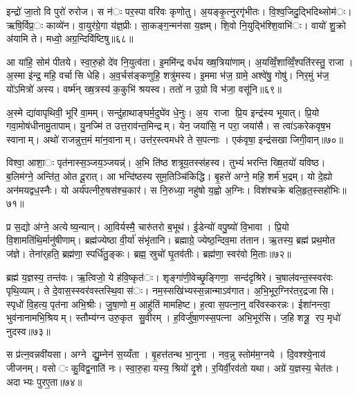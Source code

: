 इन्द्रो॑ जा॒तो वि पुरो॑ रुरोज। स न॑ः पर॒स्पा वरि॑वः कृणोतु। अ॒यङ्कृ॒त्नुरगृ॑भीतः। वि॒श्व॒जिदु॒द्भिदिथ्सोम॑ः। ऋषि॒र्विप्र॒ः काव्ये॑न। वा॒युर॑ग्रे॒गा य॑ज्ञ॒प्रीः। सा॒कङ्ग॒न्मन॑सा य॒ज्ञम्। शि॒वो नि॒युद्भि॑श्शि॒वाभि॑ः। वायो॑ शु॒क्रो अ॑यामि ते। मध्वो॒ अग्र॒न्दिवि॑ष्टिषु॥६८॥

आ या॑हि॒ सोम॑ पीतये। स्वा॒रु॒हो दे॑व नि॒युत्व॑ता। इ॒ममि॑न्द्र वर्धय ख्ष॒त्रिया॑णाम्। अ॒यव्विँ॒शाव्विँ॒श्पति॑रस्तु॒ राजा। अ॒स्मा इ॑न्द्र॒ महि॒ वर्चासि धेहि। अ॒व॒र्चस॑ङ्कणुहि॒ शत्रु॑मस्य। इ॒ममा भ॑ज॒ ग्रामे॒ अश्वे॑षु॒ गोषु॑। निर॒मुं भ॑ज॒ यो॑ऽमित्रो॑ अस्य। वर्ष्म॑न् ख्ष॒त्रस्य॑ क॒कुभि॑ श्रयस्व। ततो॑ न उ॒ग्रो वि भ॑जा॒ वसू॑नि॥६९॥

अ॒स्मे द्या॑वापृथिवी॒ भूरि॑ वा॒मम्। सन्दु॑हाथाङ्घर्म॒दुघे॑व धे॒नुः। अ॒य राजा प्रि॒य इन्द्र॑स्य भूयात्। प्रि॒यो गवा॒मोष॑धीनामु॒तापाम्। यु॒नज्मि॑ त उत्त॒राव॑न्त॒मिन्द्रम्। येन॒ जया॑सि॒ न परा॒ जया॑सै। स त्वा॑ऽकरेकवृष॒भ स्वानाम्। अथो॑ राजन्नुत्त॒मं मा॑न॒वानाम्। उत्त॑र॒स्त्वमध॑रे ते स॒पत्नाः। एक॑वृषा॒ इन्द्र॑सखा जिगी॒वान्॥७०॥

विश्वा॒ आशा॒ः पृत॑नास्स॒ञ्जय॒ञ्जयन्न्॑। अ॒भि ति॑ष्ठ शत्रूय॒तस्स॑हस्व। तुभ्यं॑ भरन्ति ख्षि॒तयो॑ यविष्ठ। ब॒लिम॑ग्ने॒ अन्ति॑त॒ ओत दू॒रात्। आ भन्दि॑ष्ठस्य सुम॒तिञ्चि॑किद्धि। बृ॒हत्ते॑ अग्ने॒ महि॒ शर्म॑ भ॒द्रम्। यो दे॒ह्यो अन॑मयद्वध॒स्नैः। यो अर्य॑पत्नीरु॒षस॑श्च॒कार॑। स नि॒रुध्या॒ नहु॑षो य॒ह्वो अ॒ग्निः। विश॑श्चक्रे बलि॒हृत॒स्सहो॑भिः॥७१॥

प्र स॒द्यो अ॑ग्ने॒ अत्येष्य॒न्यान्। आ॒विर्यस्मै॒ चारु॑तरो ब॒भूथ॑। ई॒डेन्यो॑ वपु॒ष्यो॑ वि॒भावा। प्रि॒यो वि॒शामति॑थि॒र्मानु॑षीणाम्। ब्रह्म॑ज्येष्ठा वी॒र्या॑ संभृ॑तानि। ब्रह्माग्रे॒ ज्येष्ठ॒न्दिव॒मा त॑तान। ऋ॒तस्य॒ ब्रह्म॑ प्रथ॒मोत ज॑ज्ञे। तेना॑र्‌हति॒ ब्रह्म॑णा॒ स्पर्धि॑तु॒ङ्कः। ब्रह्म॒ स्रुचो॑ घृ॒तव॑तीः। ब्रह्म॑णा॒ स्वर॑वो मि॒ताः॥७२॥

ब्रह्म॑ य॒ज्ञस्य॒ तन्त॑वः। ऋ॒त्विजो॒ ये ह॑वि॒ष्कृत॑ः। शृङ्गा॑णी॒वेच्छृ॒ङ्गिणा॒ सन्द॑दृश्रिरे। च॒षाल॑वन्त॒स्स्वर॑वः पृथि॒व्याम्। ते दे॒वास॒स्स्वर॑वस्तस्थि॒वास॑ः। नम॒स्सखि॑भ्यस्स॒न्नान्माऽव॑गात। अ॒भि॒भूर॒ग्निर॑तर॒द्रजासि। स्पृधो॑ वि॒हत्य॒ पृत॑ना अभि॒श्रीः। जु॒षा॒णो म॒ आहु॑तिं मामहिष्ट। ह॒त्वा स॒पत्ना॒न्॒ वरि॑वस्करन्नः। ईशा॑नन्त्वा॒ भुव॑नानामभि॒श्रियम्। स्तौम्य॑ग्न उरु॒कृत सु॒वीरम्। ह॒विर्जु॑षा॒णस्स॒पत्ना अभि॒भूर॑सि। ज॒हि शत्रू॒ रप॒ मृधो॑ नुदस्व॥७३॥


स प्र॑त्न॒वन्नवी॑यसा। अग्ने द्यु॒म्नेन॑ स॒य्यँता। बृ॒हत्त॑तन्थ भा॒नुना। नव॒न्नु स्तोम॑म॒ग्नये। दि॒वश्श्ये॒नाय॑ जीजनम्। वसोः कु॒विद्व॒नाति॑ नः। स्वा॒रु॒हा यस्य॒ श्रियो॑ दृ॒शे। र॒यिर्वी॒रव॑तो यथा। अग्रे॑ य॒ज्ञस्य॒ चेत॑तः। अदाभ्यः पुरए॒ता॥७४॥

